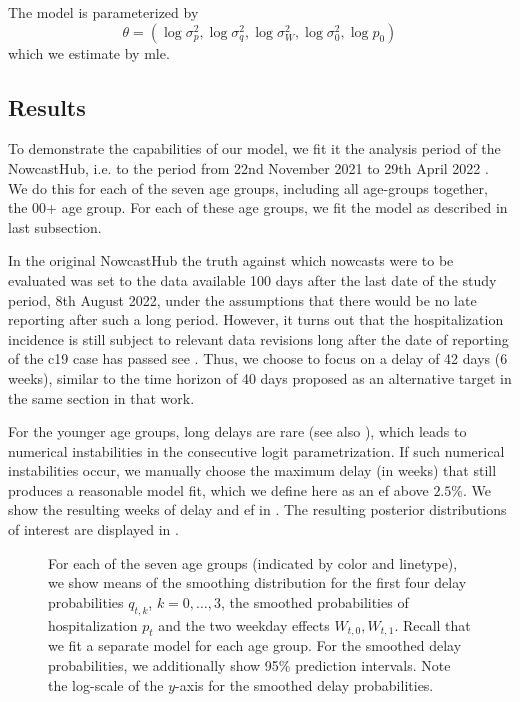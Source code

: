The model is parameterized by 
$$
    \theta = \left( \log \sigma^{2}_{p}, \log \sigma_{q}^{2}, \log \sigma^{2}_W, \log \sigma^{2}_0, \log p_{0} \right)
$$
which we estimate by \acrshort{mle}. 



\subsection{Results}

To demonstrate the capabilities of our model, we fit it the analysis period of the NowcastHub, i.e. to the period from 22nd November 2021 to 29th April 2022 \citep{Wolffram2023Collaborative}. We do this for each of the seven age groups, including all age-groups together, the 00+ age group. 
For each of these age groups, we fit the model as described in last subsection. 

In the original NowcastHub the truth against which nowcasts were to be evaluated was set to the data available 100 days after the last date of the study period, 8th August 2022, under the assumptions that there would be no late reporting after such a long period. However, it turns out that the hospitalization incidence is still subject to relevant data revisions long after the date of reporting of the \acrshort{c19} case has passed see \citep[Section 3.7]{Wolffram2023Collaborative}. Thus, we choose to focus on a delay of 42 days (6 weeks), similar to the time horizon of 40 days proposed as an alternative target in the same section in that work. 

For the younger age groups, long delays are rare (see also ), which leads to numerical instabilities in the consecutive logit parametrization. If such numerical instabilities occur, we manually choose the maximum delay (in weeks) that still produces a reasonable model fit, which we define here as an \acrshort{ef} above $2.5\%$. We show the resulting weeks of delay and \acrshort{ef} in . The resulting posterior distributions of interest are displayed in . 

\begin{figure}
    \resizebox{\textwidth}{!}{%
    }
    \caption{For each of the seven age groups (indicated by color and linetype), we show means of the smoothing distribution for the first four delay probabilities $q_{t,k}$, $k = 0,\dots, 3$, the smoothed probabilities of hospitalization $p_t$ and the two weekday effects $W_{t,0}, W_{t,1}$. Recall that we fit a separate model for each age group. For the smoothed delay probabilities, we additionally show 95\% prediction intervals. Note the log-scale of the $y$-axis for the smoothed delay probabilities. %
    }
    \label{fig:hospitalization_showcase_results}
\end{figure}

